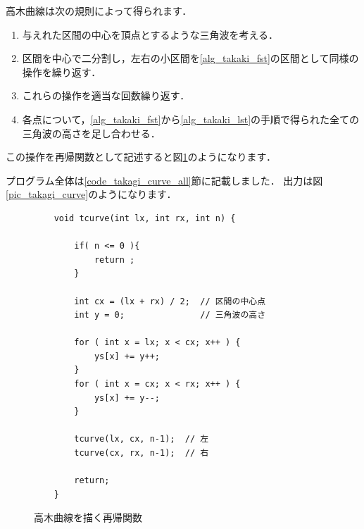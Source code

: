 \documentclass[dvipdfmx]{jsarticle}
\theoremstyle{definition}
\begin{document}
高木曲線は次の規則によって得られます．
\begin{enumerate}
    \item 与えれた区間の中心を頂点とするような三角波を考える． \label{alg_takaki_fst}
    \item 区間を中心で二分割し，左右の小区間を\ref{alg_takaki_fst}の区間として同様の操作を繰り返す．
    \item これらの操作を適当な回数繰り返す． \label{alg_takaki_lst}
    \item 各点について，\ref{alg_takaki_fst}から\ref{alg_takaki_lst}の手順で得られた全ての三角波の高さを足し合わせる．
\end{enumerate}

この操作を再帰関数として記述すると図\ref{code_takagi_curve}のようになります．

プログラム全体は\ref{code_takagi_curve_all}節に記載しました．
出力は図\ref{pic_takagi_curve}のようになります．

\begin{figure}[ht]
\begin{center}
\begin{oframed}
\footnotesize
\begin{verbatim}
    void tcurve(int lx, int rx, int n) {

        if( n <= 0 ){
            return ;
        }

        int cx = (lx + rx) / 2;  // 区間の中心点
        int y = 0;               // 三角波の高さ

        for ( int x = lx; x < cx; x++ ) {
            ys[x] += y++;
        }
        for ( int x = cx; x < rx; x++ ) {
            ys[x] += y--;
        }

        tcurve(lx, cx, n-1);  // 左
        tcurve(cx, rx, n-1);  // 右

        return;
    }
\end{verbatim}
\end{oframed}
\end{center}
\caption{高木曲線を描く再帰関数}
\label{code_takagi_curve}
\end{figure}

\end{document}
